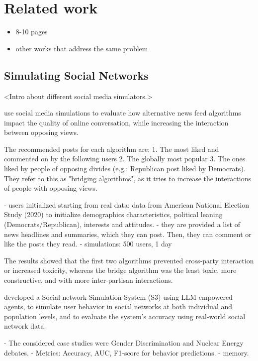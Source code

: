 \section{Related work}
\label{sec:relatedwork}

\begin{itemize} 
    \item 8-10 pages
    \item other works that address the same problem 
\end{itemize}

\subsection{Simulating Social Networks}

<Intro about different social media simulators.>

\citet{törnberg2023simulatingsocialmediausing} use social media simulations to evaluate how alternative news feed algorithms impact the quality of online conversation, while increasing the interaction between opposing views.

The recommended posts for each algorithm are:
1. The most liked and commented on by the following users
2. The globally most popular
3. The ones liked by people of opposing divides (e.g.: Republican post liked by Democrats). They refer to this as "bridging algorithms", as it tries to increase the interactions of people with opposing views.

- users initialized starting from real data: data from American National Election Study (2020) to initialize demographics characteristics, political leaning (Democrats/Republican), interests and attitudes.
- they are provided a list of news headlines and summaries, which they can post. Then, they can comment or like the posts they read.
- simulations: 500 users, 1 day

The results showed that the first two algorithms prevented cross-party interaction or increased toxicity, whereas the bridge algorithm was the least toxic, more constructive, and with more inter-partisan interactions.

\citet{gao2023s3socialnetworksimulationlarge} developed a Social-network Simulation System (S3) using LLM-empowered agents, to simulate user behavior in social networks at both individual and population levels, and to evaluate the system’s accuracy using real-world social network data.

- The considered case studies were Gender Discrimination and Nuclear Energy debates.
- Metrics: Accuracy, AUC, F1-score for behavior predictions.
- memory.

